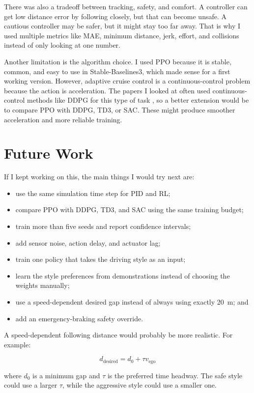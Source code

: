 \documentclass{article}
\begin{document}
There was also a tradeoff between tracking, safety, and comfort. A controller can get low distance error by following closely, but that can become unsafe. A cautious controller may be safer, but it might stay too far away. That is why I used multiple metrics like MAE, minimum distance, jerk, effort, and collisions instead of only looking at one number.

Another limitation is the algorithm choice. I used PPO because it is stable, common, and easy to use in Stable-Baselines3, which made sense for a first working version. However, adaptive cruise control is a continuous-control problem because the action is acceleration. The papers I looked at often used continuous-control methods like DDPG for this type of task \cite{lillicrap2015ddpg,lin2020comparison}, so a better extension would be to compare PPO with DDPG, TD3, or SAC. These might produce smoother acceleration and more reliable training.


\section{Future Work}

If I kept working on this, the main things I would try next are:

\begin{itemize}
    \item use the same simulation time step for PID and RL;
    \item compare PPO with DDPG, TD3, and SAC using the same training budget;
    \item train more than five seeds and report confidence intervals;
    \item add sensor noise, action delay, and actuator lag;
    \item train one policy that takes the driving style as an input;
    \item learn the style preferences from demonstrations instead of choosing the weights manually;
    \item use a speed-dependent desired gap instead of always using exactly \SI{20}{m}; and
    \item add an emergency-braking safety override.
\end{itemize}

A speed-dependent following distance would probably be more realistic. For example:

\[
d_{\mathrm{desired}} = d_0 + \tau v_{\mathrm{ego}}
\]

where $d_0$ is a minimum gap and $\tau$ is the preferred time headway. The safe style could use a larger $\tau$, while the aggressive style could use a smaller one.
\end{document}
